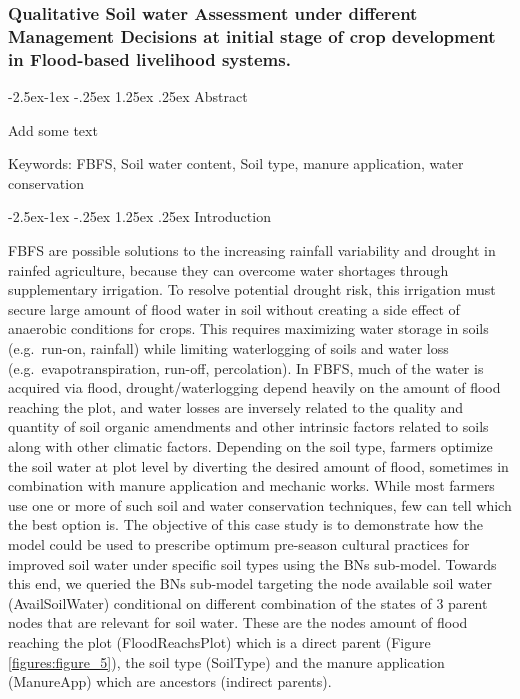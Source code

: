 \documentclass[12pt,oneside]{article}
\makeatletter
\renewcommand\paragraph{\@startsection{paragraph}{4}{\z@}%
            {-2.5ex\@plus -1ex \@minus -.25ex}%
            {1.25ex \@plus .25ex}%
            {\normalfont\normalsize\bfseries}}
\makeatother
\begin{document}
\hypertarget{qualitative-soil-water-assessment-under-different-management-decisions-at-initial-stage-of-crop-development-in-flood-based-livelihood-systems.}{%
\subsubsection{Qualitative Soil water Assessment under different
Management Decisions at initial stage of crop development in Flood-based
livelihood
systems.}\label{qualitative-soil-water-assessment-under-different-management-decisions-at-initial-stage-of-crop-development-in-flood-based-livelihood-systems.}}

\hypertarget{abstract}{%
\paragraph{Abstract}\label{abstract}}

Add some text

Keywords: FBFS, Soil water content, Soil type, manure application, water
conservation

\hypertarget{introduction-1}{%
\paragraph{Introduction}\label{introduction-1}}

FBFS are possible solutions to the increasing rainfall variability and
drought in rainfed agriculture, because they can overcome water
shortages through supplementary irrigation. To resolve potential drought
risk, this irrigation must secure large amount of flood water in soil
without creating a side effect of anaerobic conditions for crops. This
requires maximizing water storage in soils (e.g.~run-on, rainfall) while
limiting waterlogging of soils and water loss (e.g.~evapotranspiration,
run-off, percolation). In FBFS, much of the water is acquired via flood,
drought/waterlogging depend heavily on the amount of flood reaching the
plot, and water losses are inversely related to the quality and quantity
of soil organic amendments and other intrinsic factors related to soils
along with other climatic factors. Depending on the soil type, farmers
optimize the soil water at plot level by diverting the desired amount of
flood, sometimes in combination with manure application and mechanic
works. While most farmers use one or more of such soil and water
conservation techniques, few can tell which the best option is. The
objective of this case study is to demonstrate how the model could be
used to prescribe optimum pre-season cultural practices for improved
soil water under specific soil types using the BNs sub-model. Towards
this end, we queried the BNs sub-model targeting the node available soil
water (AvailSoilWater) conditional on different combination of the
states of 3 parent nodes that are relevant for soil water. These are the
nodes amount of flood reaching the plot (FloodReachsPlot) which is a
direct parent (Figure \ref{figures:figure_5}), the soil type (SoilType)
and the manure application (ManureApp) which are ancestors (indirect
parents).
\end{document}
